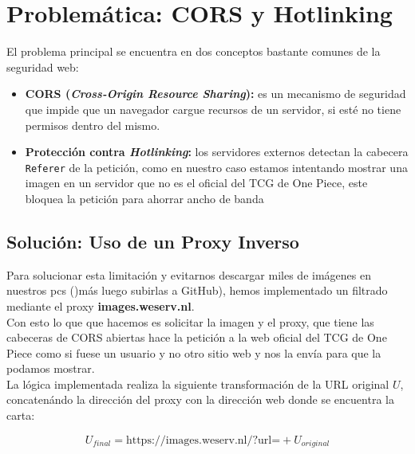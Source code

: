 \documentclass[10pt]{article}
\begin{document}
			\section{Problemática: CORS y Hotlinking}
			El problema principal se encuentra en dos conceptos bastante comunes de la seguridad web:
			\begin{itemize}
				\item \textbf{CORS (\textit{Cross-Origin Resource Sharing}):} es un mecanismo de seguridad que impide que un navegador cargue recursos de un servidor, si esté no tiene permisos dentro del mismo.
				\item \textbf{Protección contra \textit{Hotlinking}:} los servidores externos detectan la cabecera \texttt{Referer} de la petición, como en nuestro caso estamos intentando mostrar una imagen en un servidor que no es el oficial del TCG de One Piece, este bloquea la petición para ahorrar ancho de banda
			\end{itemize}
			
			\subsection{Solución: Uso de un Proxy Inverso}
			Para solucionar esta limitación y evitarnos  descargar miles de imágenes en nuestros pcs ()más luego subirlas a GitHub), hemos implementado un filtrado mediante el proxy \textbf{images.weserv.nl}. \\
			Con esto lo que que hacemos es solicitar la imagen y el proxy, que tiene las cabeceras de CORS abiertas hace la petición a la web oficial del TCG de One Piece como si fuese un usuario y no otro sitio web y nos la envía para que la podamos mostrar.\\
			
			La lógica implementada realiza la siguiente transformación de la URL original $U$, concatenándo la dirección del proxy con la dirección web donde se encuentra la carta:
			
			\begin{equation*}U_{final} = \text{https://images.weserv.nl/?url=} + U_{original} \end{equation*}
			
\end{document}

